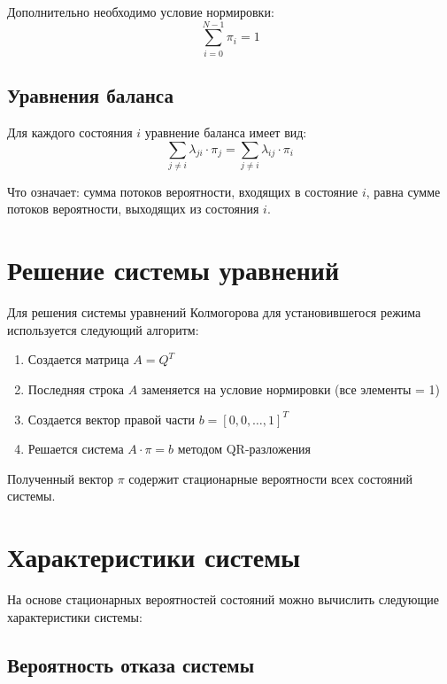 Дополнительно необходимо условие нормировки:
\begin{equation}
    \sum_{i=0}^{N-1} \pi_i = 1
\end{equation}

\subsection{Уравнения баланса}

Для каждого состояния $i$ уравнение баланса имеет вид:
\begin{equation}
    \sum_{j \neq i} \lambda_{ji} \cdot \pi_j = \sum_{j \neq i} \lambda_{ij} \cdot \pi_i
\end{equation}

Что означает: сумма потоков вероятности, входящих в состояние $i$, равна сумме потоков вероятности, выходящих из состояния $i$.

\section{Решение системы уравнений}

Для решения системы уравнений Колмогорова для установившегося режима используется следующий алгоритм:

\begin{enumerate}
    \item Создается матрица $A = Q^T$
    \item Последняя строка $A$ заменяется на условие нормировки (все элементы = 1)
    \item Создается вектор правой части $b = [0, 0, \ldots, 1]^T$
    \item Решается система $A \cdot \pi = b$ методом QR-разложения
\end{enumerate}

Полученный вектор $\pi$ содержит стационарные вероятности всех состояний системы.

\section{Характеристики системы}

На основе стационарных вероятностей состояний можно вычислить следующие характеристики системы:

\subsection{Вероятность отказа системы}

